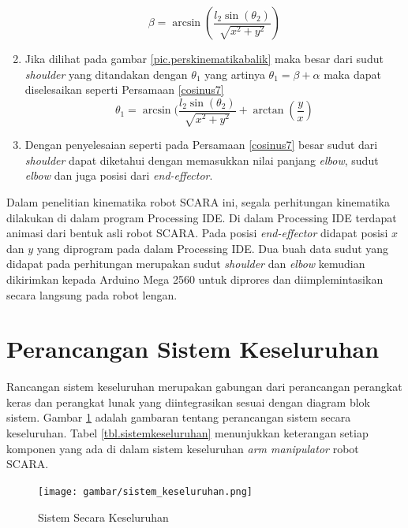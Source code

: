 \begin{enumerate}
	\begin{equation}
	\beta=\arcsin(\frac{l_{2}\sin(\theta_{2})}{\sqrt{x^2+y^2}})
	\label{cosinus6}
	\end{equation}
	\item Jika dilihat pada gambar \ref{pic.perskinematikabalik} maka besar dari sudut \textit{shoulder} yang ditandakan dengan $\theta_{1}$ yang artinya $\theta_{1}=\beta+\alpha$ maka dapat diselesaikan seperti Persamaan \ref{cosinus7}
	\begin{equation}
	\theta_{1}=\arcsin(\frac{l_{2}\sin(\theta_{2})}{\sqrt{x^2+y^2}}+\arctan(\frac{y}{x})
	\label{cosinus7}
	\end{equation}
	\item  Dengan penyelesaian seperti pada Persamaan \ref{cosinus7} besar sudut dari \textit{shoulder} dapat diketahui dengan memasukkan nilai panjang \textit{elbow}, sudut \textit{elbow} dan juga posisi dari \textit{end-effector}.
\end{enumerate}

Dalam penelitian kinematika robot SCARA ini, segala perhitungan kinematika dilakukan di dalam program Processing IDE. Di dalam Processing IDE terdapat animasi dari bentuk asli robot SCARA. Pada posisi \textit{end-effector} didapat posisi $x$ dan $y$ yang diprogram pada dalam Processing IDE. Dua buah data sudut yang didapat pada perhitungan merupakan sudut \textit{shoulder} dan \textit{elbow} kemudian dikirimkan kepada Arduino Mega 2560 untuk diprores dan diimplemintasikan secara langsung pada robot lengan.

\section{Perancangan Sistem Keseluruhan}
Rancangan sistem keseluruhan merupakan gabungan dari perancangan perangkat keras dan perangkat lunak yang diintegrasikan sesuai dengan diagram blok sistem. Gambar \ref{pic.sistemkeseluruhan} adalah gambaran tentang perancangan sistem secara keseluruhan. Tabel \ref{tbl.sistemkeseluruhan}  menunjukkan keterangan setiap komponen yang ada di dalam sistem keseluruhan \textit{arm manipulator} robot SCARA. 
\begin{figure}[H]
	\centering
	\texttt{[image: gambar/sistem\_keseluruhan.png]}
	\caption{Sistem Secara Keseluruhan}
	\label{pic.sistemkeseluruhan}
\end{figure}

